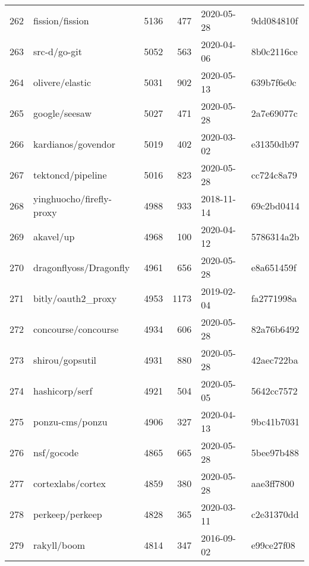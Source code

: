 \begin{longtable}{llrrll}
    262 &                                    fission/fission &   5136 &    477 & 2020-05-28 &  9dd084810f \\
    263 &                                       src-d/go-git &   5052 &    563 & 2020-04-06 &  8b0c2116ce \\
    264 &                                    olivere/elastic &   5031 &    902 & 2020-05-13 &  639b7f6e0c \\
    265 &                                      google/seesaw &   5027 &    471 & 2020-05-28 &  2a7e69077c \\
    266 &                                 kardianos/govendor &   5019 &    402 & 2020-03-02 &  e31350db97 \\
    267 &                                  tektoncd/pipeline &   5016 &    823 & 2020-05-28 &  cc724c8a79 \\
    268 &                           yinghuocho/firefly-proxy &   4988 &    933 & 2018-11-14 &  69c2bd0414 \\
    269 &                                          akavel/up &   4968 &    100 & 2020-04-12 &  5786314a2b \\
    270 &                             dragonflyoss/Dragonfly &   4961 &    656 & 2020-05-28 &  e8a651459f \\
    271 &                                 bitly/oauth2\_proxy &   4953 &   1173 & 2019-02-04 &  fa2771998a \\
    272 &                                concourse/concourse &   4934 &    606 & 2020-05-28 &  82a76b6492 \\
    273 &                                    shirou/gopsutil &   4931 &    880 & 2020-05-28 &  42aec722ba \\
    274 &                                     hashicorp/serf &   4921 &    504 & 2020-05-05 &  5642cc7572 \\
    275 &                                    ponzu-cms/ponzu &   4906 &    327 & 2020-04-13 &  9bc41b7031 \\
    276 &                                         nsf/gocode &   4865 &    665 & 2020-05-28 &  5bee97b488 \\
    277 &                                  cortexlabs/cortex &   4859 &    380 & 2020-05-28 &  aae3ff7800 \\
    278 &                                    perkeep/perkeep &   4828 &    365 & 2020-03-11 &  c2e31370dd \\
    279 &                                        rakyll/boom &   4814 &    347 & 2016-09-02 &  e99ce27f08 \\

\end{longtable}

